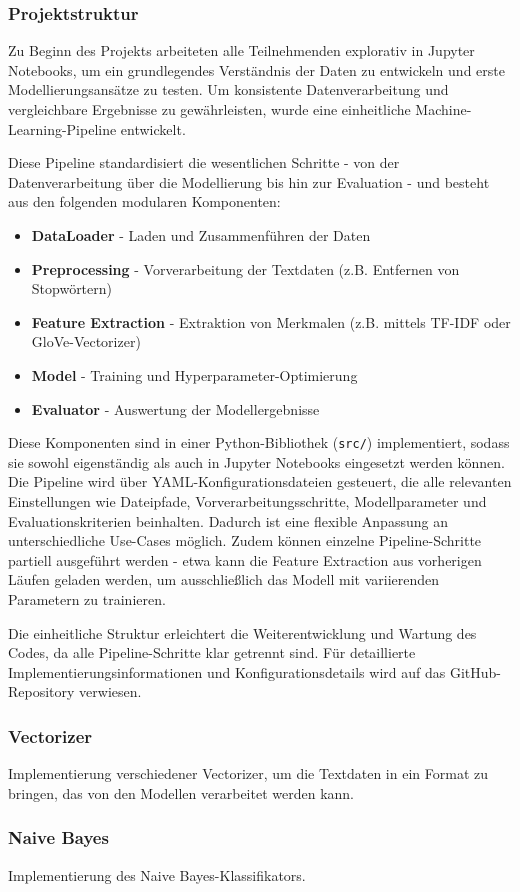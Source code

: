 \subsubsection{Projektstruktur}

Zu Beginn des Projekts arbeiteten alle Teilnehmenden explorativ in Jupyter Notebooks, um ein grundlegendes Verständnis der Daten zu entwickeln und erste Modellierungsansätze zu testen. Um konsistente Datenverarbeitung und vergleichbare Ergebnisse zu gewährleisten, wurde eine einheitliche Machine-Learning-Pipeline entwickelt.

Diese Pipeline standardisiert die wesentlichen Schritte - von der Datenverarbeitung über die Modellierung bis hin zur Evaluation - und besteht aus den folgenden modularen Komponenten:

\begin{itemize}
    \item \textbf{DataLoader} - Laden und Zusammenführen der Daten
    \item \textbf{Preprocessing} - Vorverarbeitung der Textdaten (z.B. Entfernen von Stopwörtern)
    \item \textbf{Feature Extraction} - Extraktion von Merkmalen (z.B. mittels TF-IDF oder GloVe-Vectorizer)
    \item \textbf{Model} - Training und Hyperparameter-Optimierung
    \item \textbf{Evaluator} - Auswertung der Modellergebnisse
\end{itemize}

Diese Komponenten sind in einer Python-Bibliothek (\texttt{src/}) implementiert, sodass sie sowohl eigenständig als auch in Jupyter Notebooks eingesetzt werden können. Die Pipeline wird über YAML-Konfigurationsdateien gesteuert, die alle relevanten Einstellungen wie Dateipfade, Vorverarbeitungsschritte, Modellparameter und Evaluationskriterien beinhalten. Dadurch ist eine flexible Anpassung an unterschiedliche Use-Cases möglich. Zudem können einzelne Pipeline-Schritte partiell ausgeführt werden - etwa kann die Feature Extraction aus vorherigen Läufen geladen werden, um ausschließlich das Modell mit variierenden Parametern zu trainieren.

Die einheitliche Struktur erleichtert die Weiterentwicklung und Wartung des Codes, da alle Pipeline-Schritte klar getrennt sind. Für detaillierte Implementierungsinformationen und Konfigurationsdetails wird auf das GitHub-Repository verwiesen.

\subsubsection{Vectorizer}
Implementierung verschiedener Vectorizer, um die Textdaten in ein Format zu bringen, das von den Modellen verarbeitet werden kann.

\subsubsection{Naive Bayes}
Implementierung des Naive Bayes-Klassifikators.

